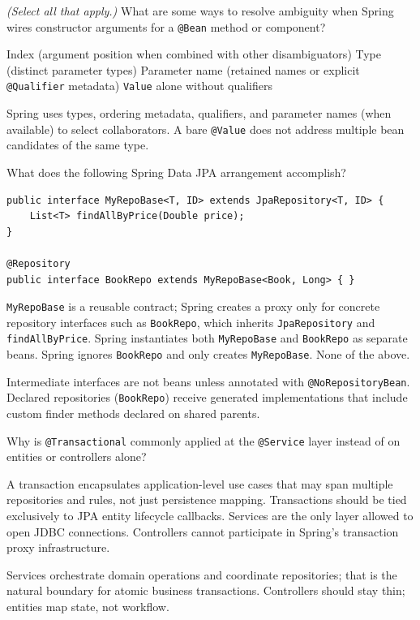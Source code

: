 \question[4]
\textit{(Select all that apply.)} What are some ways to resolve ambiguity when Spring wires constructor arguments for a \texttt{@Bean} method or component?
\begin{checkboxes}
  \CorrectChoice Index (argument position when combined with other disambiguators)
  \CorrectChoice Type (distinct parameter types)
  \CorrectChoice Parameter name (retained names or explicit \texttt{@Qualifier} metadata)
  \choice \texttt{Value} alone without qualifiers
\end{checkboxes}
\begin{solution}
  Spring uses types, ordering metadata, qualifiers, and parameter names (when available) to select collaborators. A bare \texttt{@Value} does not address multiple bean candidates of the same type.
\end{solution}

\question[4]
What does the following Spring Data JPA arrangement accomplish?
\begin{lstlisting}[style=java]
public interface MyRepoBase<T, ID> extends JpaRepository<T, ID> {
    List<T> findAllByPrice(Double price);
}

@Repository
public interface BookRepo extends MyRepoBase<Book, Long> { }
\end{lstlisting}
\begin{choices}
  \CorrectChoice \texttt{MyRepoBase} is a reusable contract; Spring creates a proxy only for concrete repository interfaces such as \texttt{BookRepo}, which inherits \texttt{JpaRepository} and \texttt{findAllByPrice}.
  \choice Spring instantiates both \texttt{MyRepoBase} and \texttt{BookRepo} as separate beans.
  \choice Spring ignores \texttt{BookRepo} and only creates \texttt{MyRepoBase}.
  \choice None of the above.
\end{choices}
\begin{solution}
  Intermediate interfaces are not beans unless annotated with \texttt{@NoRepositoryBean}. Declared repositories (\texttt{BookRepo}) receive generated implementations that include custom finder methods declared on shared parents.
\end{solution}

\question[4]
Why is \texttt{@Transactional} commonly applied at the \texttt{@Service} layer instead of on entities or controllers alone?
\begin{choices}
  \CorrectChoice A transaction encapsulates application-level use cases that may span multiple repositories and rules, not just persistence mapping.
  \choice Transactions should be tied exclusively to JPA entity lifecycle callbacks.
  \choice Services are the only layer allowed to open JDBC connections.
  \choice Controllers cannot participate in Spring's transaction proxy infrastructure.
\end{choices}
\begin{solution}
  Services orchestrate domain operations and coordinate repositories; that is the natural boundary for atomic business transactions. Controllers should stay thin; entities map state, not workflow.
\end{solution}

